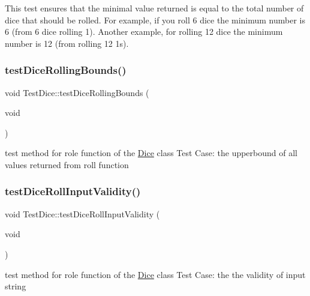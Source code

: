 This test ensures that the minimal value returned is equal to the total number of dice that should be rolled. For example, if you roll 6 dice the minimum number is 6 (from 6 dice rolling 1). Another example, for rolling 12 dice the minimum number is 12 (from rolling 12 1s). \hypertarget{class_test_dice_a6e81399d8157900629dee02c92ce5f8a}{}\label{class_test_dice_a6e81399d8157900629dee02c92ce5f8a} 
\subsubsection{\texorpdfstring{test\+Dice\+Rolling\+Bounds()}{testDiceRollingBounds()}}
{\footnotesize\ttfamily void Test\+Dice\+::test\+Dice\+Rolling\+Bounds (\begin{DoxyParamCaption}\item[{void}]{ }\end{DoxyParamCaption})\hspace{0.3cm}{\ttfamily [protected]}}

test method for role function of the \hyperlink{class_dice}{Dice} class Test Case\+: the upperbound of all values returned from roll function \hypertarget{class_test_dice_a1c5bd286c8d9714b97b67ddbfccb12f6}{}\label{class_test_dice_a1c5bd286c8d9714b97b67ddbfccb12f6} 
\subsubsection{\texorpdfstring{test\+Dice\+Roll\+Input\+Validity()}{testDiceRollInputValidity()}}
{\footnotesize\ttfamily void Test\+Dice\+::test\+Dice\+Roll\+Input\+Validity (\begin{DoxyParamCaption}\item[{void}]{ }\end{DoxyParamCaption})\hspace{0.3cm}{\ttfamily [protected]}}

test method for role function of the \hyperlink{class_dice}{Dice} class Test Case\+: the the validity of input string \hypertarget{class_test_dice_ac7ebcb4fcc5e519bb3f7cc6b7924ade7}{}\label{class_test_dice_ac7ebcb4fcc5e519bb3f7cc6b7924ade7} 
